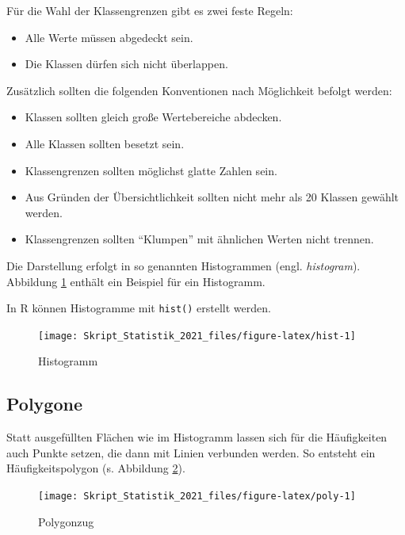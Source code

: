 \documentclass[
  11pt,
  ngerman,
  a4paper,
]{report}
\providecommand{\tightlist}{%
  \setlength{\itemsep}{0pt}\setlength{\parskip}{0pt}}
\newenvironment{rtip}{
  \medskip
  \begin{tcolorbox}[colframe=purple,colback=light_gray,title=Softwarehinweis]
}{
  \end{tcolorbox}
  \medskip
}
\begin{document}
Für die Wahl der Klassengrenzen gibt es zwei feste Regeln:

\begin{itemize}
\tightlist
\item
  Alle Werte müssen abgedeckt sein.
\item
  Die Klassen dürfen sich nicht überlappen.
\end{itemize}

Zusätzlich sollten die folgenden Konventionen nach Möglichkeit befolgt werden:

\begin{itemize}
\tightlist
\item
  Klassen sollten gleich große Wertebereiche abdecken.
\item
  Alle Klassen sollten besetzt sein.
\item
  Klassengrenzen sollten möglichst glatte Zahlen sein.
\item
  Aus Gründen der Übersichtlichkeit sollten nicht mehr als 20 Klassen gewählt werden.
\item
  Klassengrenzen sollten \enquote{Klumpen} mit ähnlichen Werten nicht trennen.
\end{itemize}

Die Darstellung erfolgt in so genannten Histogrammen (engl. \emph{histogram}). Abbildung \ref{fig:hist} enthält ein Beispiel für ein Histogramm.

\begin{rtip}
In R können Histogramme mit \verb|hist()| erstellt werden.
\end{rtip}

\begin{figure}[!h]

{\centering \texttt{[image: Skript\_Statistik\_2021\_files/figure-latex/hist-1]} 

}

\caption{Histogramm}\label{fig:hist}
\end{figure}

\hypertarget{polygone}{%
\subsection{Polygone}\label{polygone}}

Statt ausgefüllten Flächen wie im Histogramm lassen sich für die Häufigkeiten auch Punkte setzen, die dann mit Linien verbunden werden. So entsteht ein Häufigkeitspolygon (s. Abbildung \ref{fig:poly}).

\begin{figure}[!h]

{\centering \texttt{[image: Skript\_Statistik\_2021\_files/figure-latex/poly-1]} 

}

\caption{Polygonzug}\label{fig:poly}
\end{figure}
\end{document}
